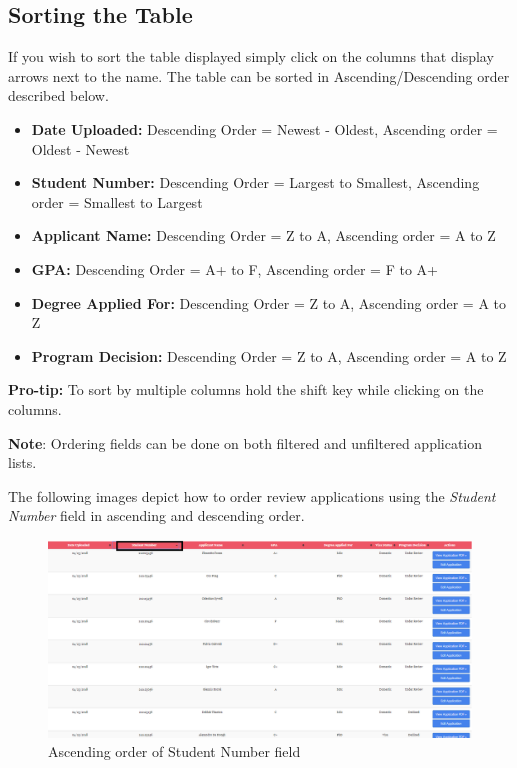 \documentclass[fontsize=12pt,paper=letter,twoside]{scrartcl}
\begin{document}
\subsection{Sorting the Table}
If you wish to sort the table displayed simply click on the columns that display arrows next to the name. The table can be sorted in Ascending/Descending order described below.
\begin{itemize}
\item \textbf{Date Uploaded:} Descending Order = Newest - Oldest, Ascending order = Oldest - Newest
\item \textbf{Student Number:} Descending Order = Largest to Smallest, Ascending order = Smallest to Largest
\item \textbf{Applicant Name:} Descending Order = Z to A, Ascending order = A to Z
\item \textbf{GPA:} Descending Order = A+ to F, Ascending order = F to A+
\item \textbf{Degree Applied For:} Descending Order = Z to A, Ascending order = A to Z
\item \textbf{Program Decision:} Descending Order = Z to A, Ascending order = A to Z
\end{itemize}
\textbf{Pro-tip:} To sort by multiple columns hold the shift key while clicking on the columns.

\bigskip
\noindent \textbf{Note}: Ordering fields can be done on both filtered and unfiltered application lists.

\bigskip
\noindent The following images depict how to order review applications using the \emph{Student Number} field in ascending and descending order.

\begin{figure}[!htb]
\begin{center}
\includegraphics[width=.99\textwidth]{images/ma/order_ascending.png}
\end{center}
\caption{Ascending order of Student Number field}
\label{fig:order_ascending}
\end{figure}
\end{document}
